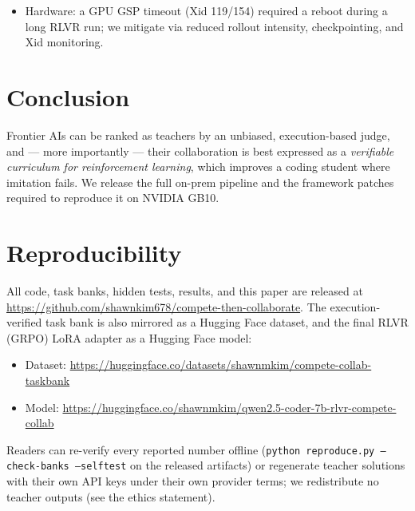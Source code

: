 \documentclass[11pt]{article}
\begin{document}
\begin{itemize}
    benchmarking and methodology study --- not the development, deployment, or distillation of a
    commercial model that competes with any provider; no trained model is offered as a product.
    This purpose places the work outside the \emph{competition-scoped} restrictions of Anthropic
    (no competing product / competing-model training) and OpenAI (no models that compete with
    OpenAI); Google's Gemini terms are likewise competition-scoped. We additionally (i)~do
    \textbf{not} redistribute any teacher's raw outputs, (ii)~do \textbf{not} release models
    trained on teacher outputs, and (iii)~base the headline RLVR result on public competition
    problems with an execution reward --- using \textbf{no teacher-output distillation} --- which
    also addresses xAI's act-scoped restriction on distilling outputs. Correctness is judged by
    deterministic execution, not teacher imitation; released tasks/tests/harness let others
    reproduce every number either offline (re-verify released artifacts) or by regenerating
    teacher solutions under their own provider agreements.
  \item Hardware: a GPU GSP timeout (Xid 119/154) required a reboot during a long RLVR run; we
    mitigate via reduced rollout intensity, checkpointing, and Xid monitoring.
\end{itemize}

\section{Conclusion}
Frontier AIs can be ranked as teachers by an unbiased, execution-based judge, and --- more
importantly --- their collaboration is best expressed as a \emph{verifiable curriculum for
reinforcement learning}, which improves a coding student where imitation fails. We release the
full on-prem pipeline and the framework patches required to reproduce it on NVIDIA GB10.

\section*{Reproducibility}
All code, task banks, hidden tests, results, and this paper are released at
\url{https://github.com/shawnkim678/compete-then-collaborate}. The execution-verified task bank is
also mirrored as a Hugging Face dataset, and the final RLVR (GRPO) LoRA adapter as a Hugging Face
model:
\begin{itemize}
  \item Dataset: \url{https://huggingface.co/datasets/shawnmkim/compete-collab-taskbank}
  \item Model:   \url{https://huggingface.co/shawnmkim/qwen2.5-coder-7b-rlvr-compete-collab}
\end{itemize}
Readers can re-verify every reported number offline
(\texttt{python reproduce.py --check-banks --selftest} on the released artifacts) or regenerate
teacher solutions with their own API keys under their own provider terms; we redistribute no
teacher outputs (see the ethics statement).
\end{document}

